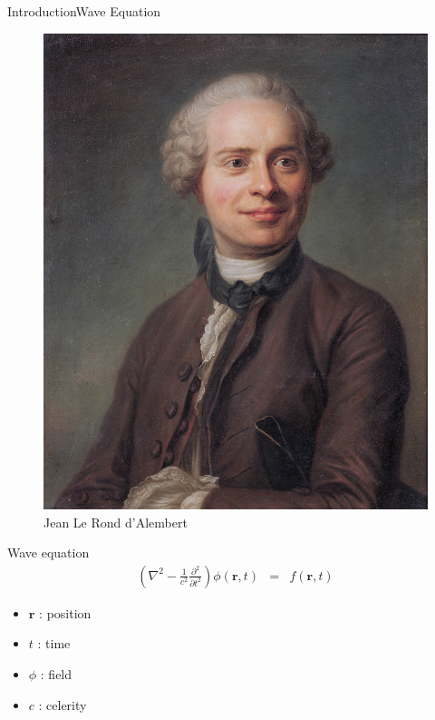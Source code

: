 \documentclass[9pt, xcolor={usenames, dvipsnames}]{beamer}
\begin{document}
				\begin{frame}{Introduction}{Wave Equation}
					\centering
					\begin{minipage}[c]{0.3\textwidth}
						\begin{figure}
							\includegraphics[width=\textwidth]{images/profile/Jean_Le_Rond_d'Alembert,_by_French_school.jpg}
							\caption{Jean Le Rond d'Alembert}
						\end{figure}
					\end{minipage}
					\hfill
					\begin{minipage}[c]{0.6\textwidth}
						\begin{alertblock}{Wave equation}
							\begin{eqnarray}
								\left(\nabla^2 - \frac{1}{c^2} \frac{\partial^2}{\partial t^2} \right) \phi(\mathbf{r}, t) & = & f(\mathbf{r}, t) \label{equation:alembert}
							\end{eqnarray}
							\begin{itemize}
								\item $\mathbf{r}$ : position
								\item $t$ : time
								\item $\phi$ : field
								\item $c$ : celerity 
							\end{itemize}
						\end{alertblock}
					\end{minipage}
				\end{frame}
\end{document}
